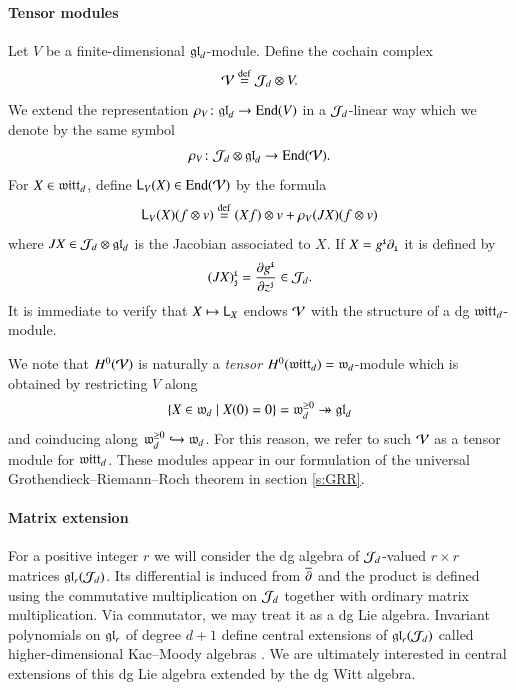 \documentclass[main.tex]{subfiles}
\begin{document}
\paragraph{Tensor modules}\label{TensorMod}
Let $V$ be a finite-dimensional $\mathfrak{gl}_d$-module.
Define the cochain complex
\begin{equation}\label{}
  \mathcal V \overset{\rm def}{=} \mathcal J_d \otimes V .
\end{equation}
We extend the representation $\rho_V \colon \mathfrak{gl}_d \to \operatorname{End}(V)$ in a $\mathcal J_d$-linear way which we denote by the
same symbol
\begin{equation}\label{}
  \rho_V \colon \mathcal J_d \otimes \mathfrak{gl}_d \to \operatorname{End}(\mathcal V) .
\end{equation}
For $X \in \mathfrak{witt}_d$, define $\mathsf{L}_{V}(X) \in \operatorname{End}(\mathcal V)$ by the formula
\begin{equation}\label{}
  \mathsf{L}_V(X) (f \otimes v) \overset{\rm def}{=} (Xf) \otimes v + \rho_V(JX) (f \otimes v)
\end{equation}
where $JX \in \mathcal J_d \otimes \mathfrak{gl}_d$ is the Jacobian associated to $X$.
If $X = g^{\textbf{\texttt{\tiny{i}}}} \partial_{\textbf{\texttt{\tiny{i}}}}$ it is defined by
\begin{equation}\label{eq:jacobian}
  (J X )_{\textbf{\texttt{\tiny{j}}}}^{\textbf{\texttt{\tiny{i}}}} = \frac{\partial g^{\textbf{\texttt{\tiny{i}}}}}{\partial z^{\textbf{\texttt{\tiny{j}}}}} \in \mathcal J_d .
\end{equation}
It is immediate to verify that $X \mapsto \mathsf L_X$ endows $\mathcal V$ with the structure of a dg $\mathfrak{witt}_d$-module.

We note that $H^0 (\mathfrak{\mathcal V})$ is naturally a \textit{tensor} $H^0(\mathfrak{witt}_d) = \mathfrak{w}_d$-module which is obtained
by restricting $V$ along
\begin{equation}\label{}
  \{X \in \mathfrak{w}_d\; | \; X(0) = 0\} = \mathfrak{w}_d^{\geq 0} \twoheadrightarrow \mathfrak{gl}_d
\end{equation}
and coinducing along $\mathfrak{w}_d^{\geq 0} \hookrightarrow \mathfrak{w}_d$.
For this reason, we refer to such $\mathcal V$ as a tensor module for $\mathfrak{witt}_d$.
These modules appear in our formulation of the universal Grothendieck--Riemann--Roch theorem in section \ref{s:GRR}.

\paragraph{Matrix extension}
For a positive integer $r$ we will consider the dg algebra of $\mathcal J_d$-valued $r \times r$ matrices $\mathfrak{gl}
_r(\mathcal J_d)$.
Its differential is induced from $\overline{\partial}$ and the product is defined using the commutative multiplication on $\mathcal J_d$
together with ordinary matrix multiplication.
Via commutator, we may treat it as a dg Lie algebra.
Invariant polynomials on $\mathfrak{gl}_r$ of degree $d+1$ define central extensions of $\mathfrak{gl}_r(\mathcal J_d)$ called
higher-dimensional Kac--Moody algebras \cite{FHK}.
We are ultimately interested in central extensions of this dg Lie algebra extended by the dg Witt algebra.
\end{document}
